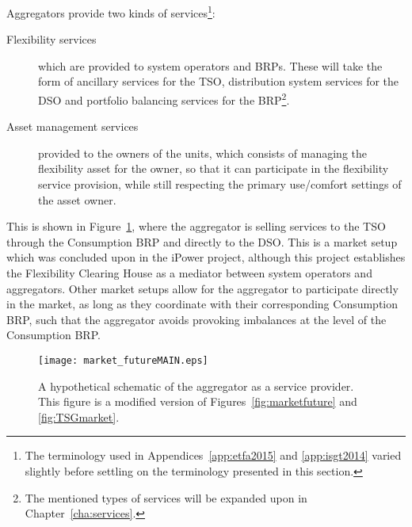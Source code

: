 Aggregators provide two kinds of services\footnote{The terminology used in Appendices~\ref{app:etfa2015} and \ref{app:isgt2014} varied slightly before settling on the terminology presented in this section.}:
\begin{description}
	\item[Flexibility services] which are provided to system operators and BRPs. These will take the form of ancillary services for the TSO, distribution system services for the DSO and portfolio balancing services for the BRP\footnote{The mentioned types of services will be expanded upon in Chapter~\ref{cha:services}.}.
	\item[Asset management services] provided to the owners of the units, which consists of managing the flexibility asset for the owner, so that it can participate in the flexibility service provision, while still respecting the primary use/comfort settings of the asset owner.
\end{description}
This is shown in Figure~\ref{fig:market_futureMAIN}, where the aggregator is selling services to the TSO through the Consumption BRP and directly to the DSO. This is a market setup which was concluded upon in the iPower project, although this project establishes the Flexibility Clearing House as a mediator between system operators and aggregators. Other market setups allow for the aggregator to participate directly in the market, as long as they coordinate with their corresponding Consumption BRP, such that the aggregator avoids provoking imbalances at the level of the Consumption BRP.
\begin{figure}[htbp!]
\centering
\texttt{[image: market\_futureMAIN.eps]}
\caption{A hypothetical schematic of the aggregator as a service provider. This figure is a modified version of Figures~\ref{fig:marketfuture} and \ref{fig:TSGmarket}.}
\label{fig:market_futureMAIN}
\end{figure}

